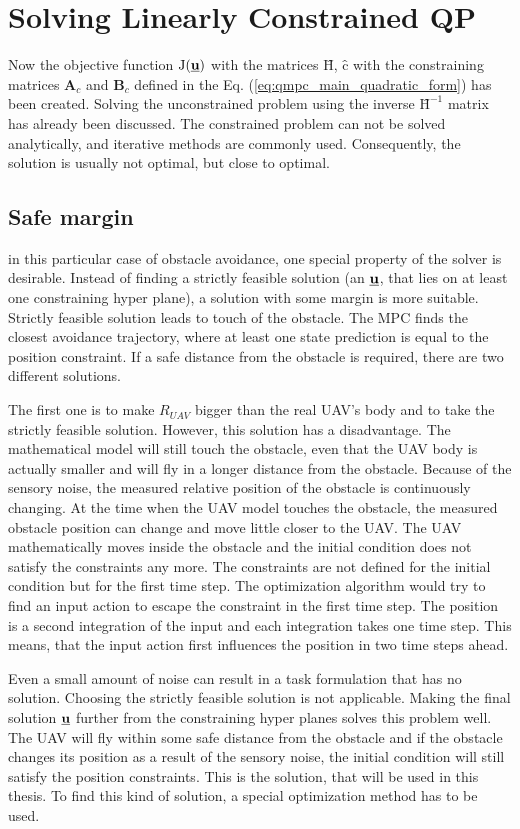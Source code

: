 \documentclass[a4paper,11pt,titlepage]{article}
\newcommand{\uvec}{\textbf{\underline{u}}}
\newcommand{\macJ}{\mathrm{J}(\uvec)}
\newcommand{\macHr}{\textbf{\^H}}
\begin{document}
\section{Solving Linearly Constrained QP}
Now the objective function $\macJ$ with the matrices $\textbf{\^H}$, $\textbf{\^c}$ with the constraining matrices $\textbf{A}_c$ and $\textbf{B}_c$ defined in the Eq. (\ref{eq:qmpc_main_quadratic_form}) has been created. Solving the unconstrained problem using the inverse $\macHr^{-1}$ matrix has already been discussed. The constrained problem can not be solved analytically, and iterative methods are commonly used. Consequently, the solution is usually not optimal, but close to optimal. 

\subsection{Safe margin}
\label{sec:safe_margin}
in this particular case of obstacle avoidance, one special property of the solver is desirable. Instead of finding a strictly feasible solution (an $\uvec$, that lies on at least one constraining hyper plane), a solution with some margin is more suitable. Strictly feasible solution leads to touch of the obstacle. The MPC finds the closest avoidance trajectory, where at least one state prediction is equal to the position constraint. If a safe distance from the obstacle is required, there are two different solutions.

The first one is to make $R_{UAV}$ bigger than the real UAV's body and to take the strictly feasible solution. However, this solution has a disadvantage. The mathematical model will still touch the obstacle, even that the UAV body is actually smaller and will fly in a longer distance from the obstacle. Because of the sensory noise, the measured relative position of the obstacle is continuously changing. At the time when the UAV model touches the obstacle, the measured obstacle position can change and move little closer to the UAV. The UAV mathematically moves inside the obstacle and the initial condition does not satisfy the constraints any more. The constraints are not defined for the initial condition but for the first time step. The optimization algorithm would try to find an input action to escape the constraint in the first time step. The position is a second integration of the input and each integration takes one time step. This means, that the input action first influences the position in two time steps ahead. 

Even a small amount of noise can result in a task formulation that has no solution. Choosing the strictly feasible solution is not applicable. Making the final solution $\uvec$ further from the constraining hyper planes solves this problem well. The UAV will fly within some safe distance from the obstacle and if the obstacle changes its position as a result of the sensory noise, the initial condition will still satisfy the position constraints. This is the solution, that will be used in this thesis. To find this kind of solution, a special optimization method has to be used.
\end{document}
